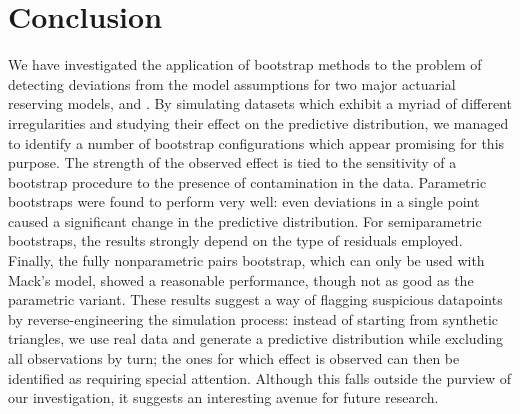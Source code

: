 \documentclass[a4paper]{book}
\begin{document}
\restoregeometry

\backmatter%

\chapter{Conclusion} \label{conclusion}

We have investigated the application of bootstrap methods to the problem of detecting deviations from the model assumptions for two major actuarial reserving models,  and . By simulating datasets which exhibit a myriad of different irregularities and studying their effect on the predictive distribution, we managed to identify a number of bootstrap configurations which appear promising for this purpose. The strength of the observed effect is tied to the sensitivity of a bootstrap procedure to the presence of contamination in the data. Parametric bootstraps were found to perform very well: even deviations in a single point caused a significant change in the predictive distribution. For semiparametric bootstraps, the results strongly depend on the type of residuals employed. Finally, the fully nonparametric pairs bootstrap, which can only be used with Mack's model, showed a reasonable performance, though not as good as the parametric variant. These results suggest a way of flagging suspicious datapoints by reverse-engineering the simulation process: instead of starting from synthetic triangles, we use real data and generate a predictive distribution while excluding all observations by turn; the ones for which effect is observed can then be identified as requiring special attention. Although this falls outside the purview of our investigation, it suggests an interesting avenue for future research.

\printbibliography%
\printindex
\end{document}
